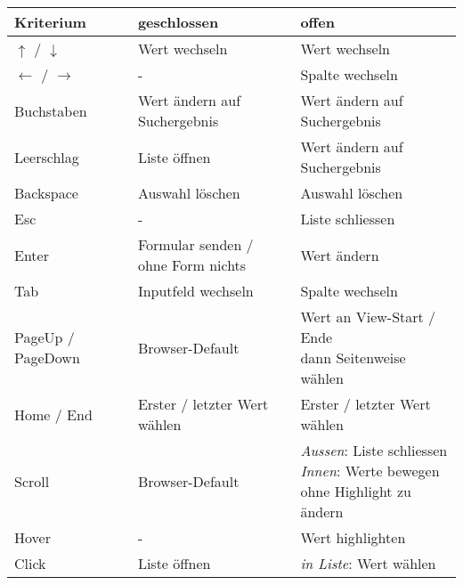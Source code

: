 \begin{table}[ht!]
    \label{table:interactionNewComponent}
    \footnotesize
    \begin{threeparttable}
        \begin{tabular}{ l || l | l }
            \bf{Kriterium}    & \bf{geschlossen} & \bf{offen} \\
            \hline \hline
            $\uparrow$ / $\downarrow$     & Wert wechseln       & Wert wechseln       \\
            \hline
            $\leftarrow$ / $\rightarrow$  & -                   & Spalte wechseln     \\
            \hline
            Buchstaben  & Wert ändern auf Suchergebnis\tnote{1} & Wert ändern auf Suchergebnis\tnote{1}  \\
            \hline
            Leerschlag  & Liste öffnen    & Wert ändern auf Suchergebnis\tnote{1}     \\
            \hline
            Backspace   & Auswahl löschen & Auswahl löschen        \\
            \hline
            Esc         & -               & Liste schliessen       \\
            \hline \hline
            Enter       & \tbbr{Formular senden / \\ ohne Form nichts} & Wert ändern  \\
            \hline
            Tab         & Inputfeld wechseln              & Spalte wechseln     \\
            \hline
            PageUp / PageDown  & Browser-Default\tnote{2} & \tbbr{Wert an View-Start / Ende \\ dann Seitenweise wählen} \\
            \hline
            Home / End & Erster / letzter Wert wählen     & Erster / letzter Wert wählen  \\
            \hline \hline
            Scroll     & Browser-Default\tnote{2}         & \tbbr{\textit{Aussen}: Liste schliessen \\
                                                                  \textit{Innen}: Werte bewegen \\ ohne Highlight zu ändern} \\
            \hline
            Hover      & -                & Wert highlighten       \\
            \hline
            Click      & Liste öffnen     & \tbbr{\textit{in Liste}: Wert wählen \\
}
\end{tabular}
\end{threeparttable}
\end{table}
